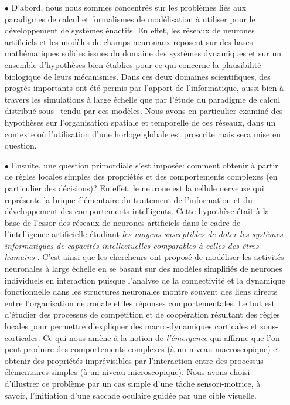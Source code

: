 \begin{itemize}

\item[$\bullet$] D'abord, nous nous sommes concentrés sur les problèmes liés aux paradigmes de calcul et formalismes de modélisation à utiliser pour le développement de systèmes énactifs. En effet, les réseaux de neurones artificiels et les modèles de champs neuronaux  reposent sur des bases mathématiques solides issues du domaine des systèmes dynamiques et sur un ensemble d'hypothèses bien établies pour ce qui concerne la plausibilité biologique de leurs mécanismes. Dans ces deux domaines scientifiques, des progrès importants ont été permis par l'apport de l'informatique, aussi bien à travers les simulations à large échelle que par l'étude du paradigme de calcul distribué sous$-$tendu par ces modèles. Nous avons en particulier examiné des hypothèses sur l'organisation spatiale et temporelle de ces réseaux, dans un contexte où l'utilisation d'une horloge globale est proscrite mais sera mise en question.\\

\item[$\bullet$] Ensuite, une question primordiale s'est imposée: comment obtenir à partir de règles locales simples des propriétés et des comportements complexes (en particulier des décisions)?  En effet, le neurone est la cellule nerveuse qui représente la brique élémentaire du traitement de l'information et du développement des comportements intelligents. Cette hypothèse était à la base de l'essor des réseaux de neurones artificiels dans le cadre de l'intelligence artificielle étudiant \textit{les moyens susceptibles de doter les systèmes informatiques de capacités intellectuelles comparables à celles des êtres humains} \cite{IA}. C'est ainsi que les chercheurs ont proposé de modéliser les activités neuronales à large échelle en se basant sur des modèles simplifiés de neurones individuels en interaction puisque l'analyse de la connectivité et la dynamique fonctionnelle dans les structures neuronales montre souvent des liens directs entre l'organisation neuronale et les réponses comportementales. Le but est d'étudier des processus de compétition et de coopération résultant des règles locales pour permettre d'expliquer des macro-dynamiques corticales et sous-corticales. Ce qui nous amène à la notion de \textit{l'\'emergence} qui affirme que l'on peut produire des comportements complexes (à un niveau macroscopique) et obtenir des propriétés imprévisibles par l'interaction entre des processus élémentaires simples (à un niveau microscopique). Nous avons choisi d'illustrer ce problème par un cas simple d'une tâche sensori-motrice, à savoir, l'initiation d'une saccade oculaire guidée par une cible visuelle. \\


\end{itemize}
